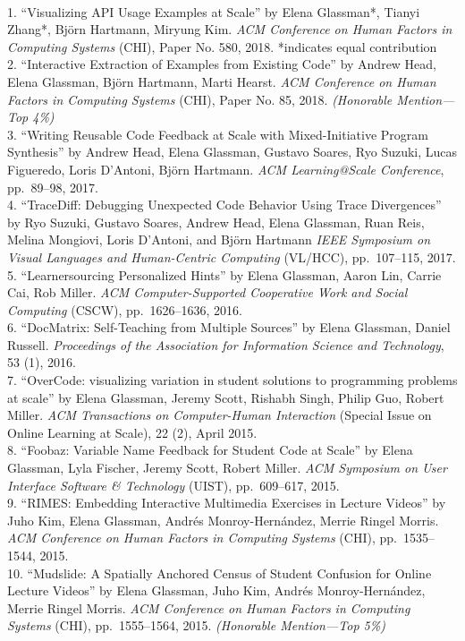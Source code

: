 \documentclass[11pt]{article}
\begin{document}
      
\\
1. ``Visualizing API Usage Examples at Scale'' by Elena Glassman*, Tianyi Zhang*, Bj\"orn Hartmann, Miryung Kim. \emph{ACM Conference on Human Factors in Computing Systems} (CHI), Paper No. 580, 2018. *indicates equal contribution\\[2pt]
2. ``Interactive Extraction of Examples from Existing Code'' by Andrew Head, Elena Glassman, Bj\"orn Hartmann, Marti Hearst. \emph{ACM Conference on Human Factors in Computing Systems} (CHI), Paper No. 85, 2018. {\em (Honorable Mention---Top 4\%)}\\[2pt]
3. ``Writing Reusable Code Feedback at Scale with Mixed-Initiative Program Synthesis'' by
Andrew Head, Elena Glassman, Gustavo Soares, Ryo Suzuki, Lucas Figueredo, Loris D'Antoni, Bj\"orn Hartmann. {\em ACM Learning@Scale Conference}, pp.~89--98, 2017.\\[2pt]
4. ``TraceDiff: Debugging Unexpected Code Behavior Using Trace Divergences'' by Ryo Suzuki, Gustavo Soares, Andrew Head, Elena Glassman, Ruan Reis, Melina Mongiovi, Loris D'Antoni, and Bj\"orn Hartmann \emph{IEEE Symposium on Visual Languages and Human-Centric Computing} (VL/HCC), pp.~107--115, 2017.\\[2pt]
5. ``Learnersourcing Personalized Hints'' by Elena Glassman, Aaron Lin, Carrie Cai, Rob Miller. \emph{ACM Computer-Supported Cooperative Work and Social Computing} (CSCW), pp.~1626--1636, 2016.\\[2pt]
6. ``DocMatrix: Self-Teaching from Multiple Sources'' by Elena Glassman, Daniel Russell. \emph{Proceedings of the Association for Information Science and Technology}, 53 (1), 2016.\\[2pt]
7. ``OverCode: visualizing variation in student solutions to programming problems at scale'' by Elena Glassman, Jeremy Scott, Rishabh Singh, Philip Guo, Robert Miller. \emph{ACM Transactions on Computer-Human Interaction} ({\small Special Issue on Online Learning at Scale}), 22 (2), April 2015.\\[2pt]
8. ``Foobaz: Variable Name Feedback for Student Code at Scale'' by Elena Glassman, Lyla Fischer, Jeremy Scott, Robert Miller. \emph{ACM Symposium on User Interface Software \& Technology} (UIST), pp.~609--617, 2015.\\[2pt]
9. ``RIMES: Embedding Interactive Multimedia Exercises in Lecture Videos'' by Juho Kim, Elena Glassman, Andr\'es Monroy-Hern\'andez, Merrie Ringel Morris. \emph{ACM Conference on Human Factors in Computing Systems} (CHI), pp.~1535--1544, 2015.\\[2pt]
10. ``Mudslide: A Spatially Anchored Census of Student Confusion for Online Lecture Videos'' by Elena Glassman, Juho Kim, Andr\'es Monroy-Hern\'andez, Merrie Ringel Morris. \emph{ACM Conference on Human Factors in Computing Systems} (CHI), pp.~1555--1564, 2015. {\em (Honorable Mention---Top 5\%)}\\[2pt]
\end{document}
